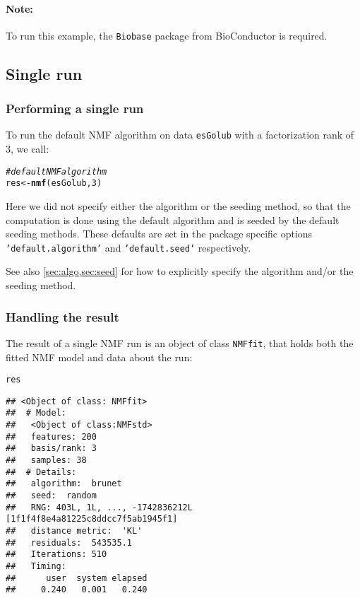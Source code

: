 \documentclass[a4paper]{article}\usepackage[]{graphicx}\usepackage[]{color}
\makeatletter
\newcommand{\hlnum}[1]{\textcolor[rgb]{0.686,0.059,0.569}{#1}}%
\newcommand{\hlcom}[1]{\textcolor[rgb]{0.678,0.584,0.686}{\textit{#1}}}%
\newcommand{\hlstd}[1]{\textcolor[rgb]{0.345,0.345,0.345}{#1}}%
\newcommand{\hlkwb}[1]{\textcolor[rgb]{0.69,0.353,0.396}{#1}}%
\newcommand{\hlkwd}[1]{\textcolor[rgb]{0.737,0.353,0.396}{\textbf{#1}}}%
\newenvironment{kframe}{%
 \def\at@end@of@kframe{}%
 \ifinner\ifhmode%
  \def\at@end@of@kframe{\end{minipage}}%
  \begin{minipage}{\columnwidth}%
 \fi\fi%
 \def\FrameCommand##1{\hskip\@totalleftmargin \hskip-\fboxsep
 \colorbox{shadecolor}{##1}\hskip-\fboxsep
     \hskip-\linewidth \hskip-\@totalleftmargin \hskip\columnwidth}%
 \MakeFramed {\advance\hsize-\width
   \@totalleftmargin\z@ \linewidth\hsize
   \@setminipage}}%
 {\par\unskip\endMakeFramed%
 \at@end@of@kframe}
\newenvironment{knitrout}{}{} %
\let\code=\texttt
\makeatother
\begin{document}
\paragraph{Note:} To run this example, the \code{Biobase} package from BioConductor is required.

\subsection{Single run}\label{sec:single_run}

\subsubsection{Performing a single run}
To run the default NMF algorithm on data \code{esGolub} with a factorization rank of 3, we call: 

\begin{knitrout}
\color{fgcolor}\begin{kframe}
\begin{alltt}
\hlcom{# default NMF algorithm}
\hlstd{res} \hlkwb{<-} \hlkwd{nmf}\hlstd{(esGolub,} \hlnum{3}\hlstd{)}
\end{alltt}
\end{kframe}
\end{knitrout}

Here we did not specify either the algorithm or the seeding method, so that the computation is done using the default algorithm and is seeded by the 
default seeding methods.
These defaults are set in the package specific options \code{'default.algorithm'} 
and \code{'default.seed'} respectively.

See also \cref{sec:algo,sec:seed} for how to explicitly specify the algorithm and/or the seeding method.

\subsubsection{Handling the result}

The result of a single NMF run is an object of class \code{NMFfit}, that holds both the fitted NMF model and data about the run:

\begin{knitrout}
\color{fgcolor}\begin{kframe}
\begin{alltt}
\hlstd{res}
\end{alltt}
\begin{verbatim}
## <Object of class: NMFfit>
##  # Model:
##   <Object of class:NMFstd>
##   features: 200 
##   basis/rank: 3 
##   samples: 38 
##  # Details:
##   algorithm:  brunet 
##   seed:  random 
##   RNG: 403L, 1L, ..., -1742836212L [1f1f4f8e4a81225c8ddcc7f5ab1945f1]
##   distance metric:  'KL' 
##   residuals:  543535.1 
##   Iterations: 510 
##   Timing:
##      user  system elapsed 
##     0.240   0.001   0.240
\end{verbatim}
\end{kframe}
\end{knitrout}
\end{document}
